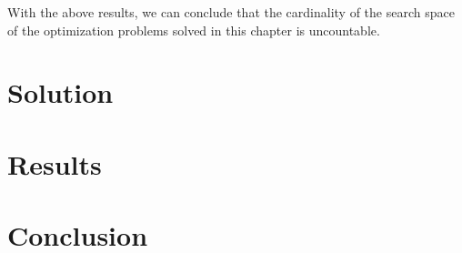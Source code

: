     With the above results, we can conclude that the cardinality of the
    search space of the optimization problems solved in this chapter is
    uncountable.

  \section{Solution}
  \label{sec:fn_opt:sol}
    \Blindtext
  \section{Results}
  \label{sec:fn_opt:results}
    \Blindtext
  \section{Conclusion}
  \label{sec:fn_opt:conclusion}
    \Blindtext
